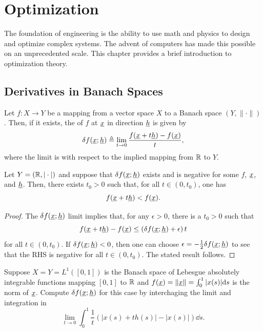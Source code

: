 \chapter{Optimization}



The foundation of engineering is the ability to use math and physics to design and optimize complex systems.
The advent of computers has made this possible on an unprecedented scale.
This chapter provides a brief introduction to optimization theory.

\section{Derivatives in Banach Spaces}

\begin{definition}
Let $f \colon X \rightarrow Y$ be a mapping from a vector space $X$ to a Banach space $(Y,\|\cdot\|)$.
Then, if it exists, the  of $f$ at $\underline{x}$ in direction $\underline{h}$ is given by
\[ \delta f (\underline{x};\underline{h}) \triangleq \lim_{t \to 0} \frac{f(\underline{x}+t \underline{h}) - f(\underline{x})}{t}, \]
where the limit is with respect to the implied mapping from $\mathbb{R}$ to $Y$.
\end{definition}

\begin{lemma}
\label{lemma:gateaux_negative}
Let $Y = (\mathbb{R},|\cdot|)$ and suppose that $\delta f (\underline{x};\underline{h})$ exists and is negative for some $f$, $\underline{x}$, and $\underline{h}$.  Then, there exists $t_0 > 0$ such that, for all $t\in(0,t_0)$, one has
\[ f(\underline{x}+t \underline{h}) < f (\underline{x}). \]
\end{lemma}
\begin{proof}
The $\delta f (\underline{x};\underline{h})$ limit implies that, for any $\epsilon > 0$, there is a $t_0 > 0$ such that
\[ f(\underline{x}+t \underline{h}) - f (\underline{x}) \leq \left( \delta f (\underline{x};\underline{h}) + \epsilon \right)t \]
for all $t\in (0,t_0)$.
If $\delta f (\underline{x};\underline{h})<0$, then one can choose $\epsilon = -\frac{1}{2}\delta f (\underline{x};\underline{h})$ to see that the RHS is negative for all $t\in (0,t_0)$.
The stated result follows.
\end{proof}

\begin{problem}
Suppose $X=Y=L^1 ([0,1])$ is the Banach space of Lebesgue absolutely integrable functions mapping $[0,1]$ to $\mathbb{R}$ and $f(\underline{x}) = \| \underline{x} \| = \int_0^1 |x(s)| \mathrm{d} s$ is the norm of $\underline{x}$.
Compute $\delta f (\underline{x};\underline{h})$ for this case by interchaging the limit and integration in
\[ \lim_{t \to 0}  \int_0^1 \frac{1}{t} \left( |x(s)+t h(s)| - |x(s)| \right) \dd s. \] 
\end{problem}

